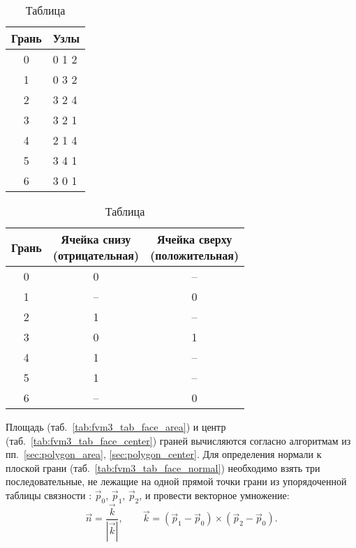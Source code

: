 \begin{table}[H]
\begin{center}
  \begin{minipage}[t]{.4\textwidth}
    \centering
    \begin{tabular}[t]{c|l}
    Грань & Узлы \\
    \hline
    0 & 0 1 2\\
    1 & 0 3 2\\
    2 & 3 2 4\\
    3 & 3 2 1\\
    4 & 2 1 4\\
    5 & 3 4 1\\
    6 & 3 0 1\\
    \end{tabular}
    \caption{\label{tab:fvm3_tab_face_point}Таблица }
  \end{minipage}%
  \begin{minipage}[t]{.4\textwidth}
    \centering
    \begin{tabular}[t]{c|c|c}
    Грань & \makecell{Ячейка снизу \\ (отрицательная)} & \makecell{Ячейка сверху \\ (положительная) }\\
    \hline
    0 &  0  & --  \\
    1 & --  &  0  \\
    2 &  1  & --  \\
    3 &  0  &  1  \\
    4 &  1  & --  \\
    5 &  1  & --  \\
    6 & --  &  0  \\
    \end{tabular}
    \caption{\label{tab:fvm3_tab_face_cell}Таблица }
  \end{minipage}%
\end{center}
\end{table}


Площадь (таб.~\ref{tab:fvm3_tab_face_area}) и центр (таб.~\ref{tab:fvm3_tab_face_center})
граней вычисляются согласно алгоритмам из пп.~\ref{sec:polygon_area}, \ref{sec:polygon_center}.
Для определения нормали к плоской грани (таб.~\ref{tab:fvm3_tab_face_normal}) необходимо
взять три последовательные, не лежащие на одной прямой точки
грани из упорядоченной таблицы связности
:
$\vec{p}_0$, $\vec{p}_1$, $\vec{p}_2$,
и провести векторное умножение:
$$
\vec n = \frac{\vec k}{|\vec k|}, \qquad \vec k = (\vec{p}_1 - \vec{p}_0)\times(\vec{p}_2 - \vec{p}_0).
$$

